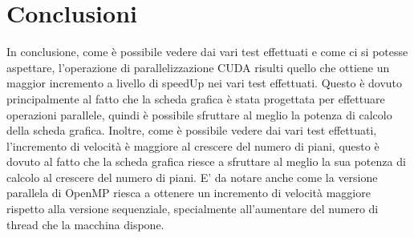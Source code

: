 \documentclass[11pt]{article}
\begin{document}
    \section{Conclusioni}\label{sec:conclusioni}
    In conclusione, come è possibile vedere dai vari test effettuati e come ci si potesse aspettare, l'operazione di
    parallelizzazione CUDA risulti quello che ottiene un maggior incremento a livello di speedUp nei vari test
    effettuati.
    Questo è dovuto principalmente al fatto che la scheda grafica è stata progettata per effettuare operazioni
    parallele, quindi è possibile sfruttare al meglio la potenza di calcolo della scheda grafica.
    Inoltre, come è possibile vedere dai vari test effettuati, l'incremento di velocità è maggiore al crescere del
    numero di piani, questo è dovuto al fatto che la scheda grafica riesce a sfruttare al meglio la sua potenza di
    calcolo al crescere del numero di piani.
    E' da notare anche come la versione parallela di OpenMP riesca a ottenere un incremento di velocità maggiore
    rispetto alla versione sequenziale, specialmente all'aumentare del numero di thread che la macchina dispone.

    \clearpage
\end{document}
